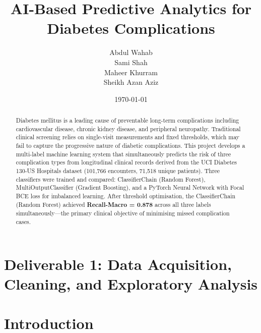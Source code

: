 \documentclass[12pt]{article}
\title{AI-Based Predictive Analytics for Diabetes Complications}
\author{
Abdul Wahab \\
Sami Shah \\
Maheer Khurram \\
Sheikh Azan Aziz
}
\date{\today}
\begin{document}
\maketitle

\begin{abstract}
Diabetes mellitus is a leading cause of preventable long-term complications including
cardiovascular disease, chronic kidney disease, and peripheral neuropathy.
Traditional clinical screening relies on single-visit measurements and fixed thresholds,
which may fail to capture the progressive nature of diabetic complications.
This project develops a multi-label machine learning system that simultaneously
predicts the risk of three complication types from longitudinal clinical records
derived from the UCI Diabetes 130-US Hospitals dataset (101,766 encounters,
71,518 unique patients).
Three classifiers were trained and compared: ClassifierChain (Random Forest),
MultiOutputClassifier (Gradient Boosting), and a PyTorch Neural Network with
Focal BCE loss for imbalanced learning.
After threshold optimisation, the ClassifierChain (Random Forest) achieved
\textbf{Recall-Macro = 0.878} across all three labels simultaneously---the primary
clinical objective of minimising missed complication cases.
\end{abstract}

\begin{center}
\end{center}



\newpage
\tableofcontents
\newpage


\section*{Deliverable 1: Data Acquisition, Cleaning, and Exploratory Analysis}


\section{Introduction}
\end{document}
